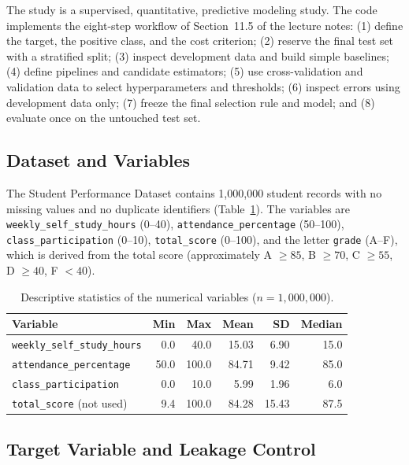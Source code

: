 \documentclass[12pt,a4paper]{article}
\theoremstyle{definition}
\begin{document}
The study is a supervised, quantitative, predictive modeling study. The code implements the eight-step workflow of Section~11.5 of the lecture notes: (1) define the target, the positive class, and the cost criterion; (2) reserve the final test set with a stratified split; (3) inspect development data and build simple baselines; (4) define pipelines and candidate estimators; (5) use cross-validation and validation data to select hyperparameters and thresholds; (6) inspect errors using development data only; (7) freeze the final selection rule and model; and (8) evaluate once on the untouched test set.

\subsection{Dataset and Variables}

The Student Performance Dataset \cite{kaggle} contains 1{,}000{,}000 student records with no missing values and no duplicate identifiers (Table~\ref{tab:desc}). The variables are \texttt{weekly\_self\_study\_hours} (0--40), \texttt{attendance\_percentage} (50--100), \texttt{class\_participation} (0--10), \texttt{total\_score} (0--100), and the letter \texttt{grade} (A--F), which is derived from the total score (approximately A $\ge 85$, B $\ge 70$, C $\ge 55$, D $\ge 40$, F $< 40$).

\begin{table}[h!]
\centering
\small
\caption{Descriptive statistics of the numerical variables ($n = 1{,}000{,}000$).}
\label{tab:desc}
\begin{tabular}{lrrrrr}
\toprule
Variable & Min & Max & Mean & SD & Median \\
\midrule
\texttt{weekly\_self\_study\_hours} & 0.0 & 40.0 & 15.03 & 6.90 & 15.0 \\
\texttt{attendance\_percentage} & 50.0 & 100.0 & 84.71 & 9.42 & 85.0 \\
\texttt{class\_participation} & 0.0 & 10.0 & 5.99 & 1.96 & 6.0 \\
\texttt{total\_score} (not used) & 9.4 & 100.0 & 84.28 & 15.43 & 87.5 \\
\bottomrule
\end{tabular}
\end{table}


\subsection{Target Variable and Leakage Control}
\end{document}
